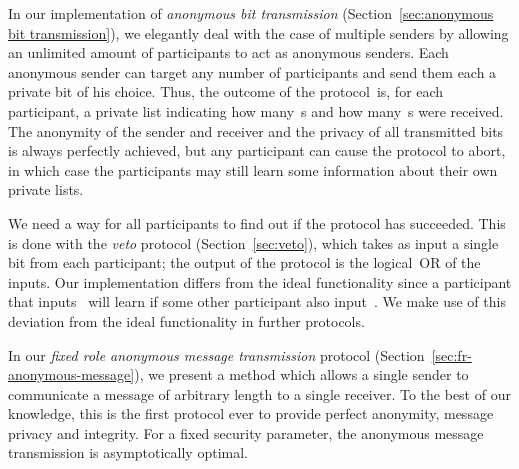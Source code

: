 \documentclass[11pt]{article}
\begin{document}
In our implementation of \emph{anonymous bit transmission}
(Section~\ref{sec:anonymous bit transmission}), we elegantly deal
with the case of multiple senders by allowing an unlimited amount of
participants to act as anonymous senders. Each anonymous sender can
target any number of participants and send them each a private bit
of his choice. Thus, the outcome of the protocol~is, for each
participant, a private list indicating how many~s and how
many~s were received. The anonymity of the sender and  receiver
and the privacy of all transmitted bits is always perfectly
achieved, but any participant can cause the protocol to abort, in
which case the participants may still learn some information about
their own private lists.


We need a way for all participants to find out if the protocol has
succeeded. This is done with the \emph{veto} protocol
(Section~\ref{sec:veto}), which takes as input a single bit from
each participant; the output of the protocol is the logical~OR of
the inputs. Our implementation differs from the ideal functionality
since a participant that inputs~ will learn if some other
participant also input~. We make use of this deviation from the
ideal functionality in further protocols.


In our \emph{fixed role anonymous message transmission} protocol
(Section~\ref{sec:fr-anonymous-message}), we present a method which
allows a single sender to communicate a message of arbitrary length
to a single receiver. To the best of our knowledge, this is the
first protocol ever to provide perfect anonymity, message privacy
and integrity. For a fixed security parameter, the anonymous message
transmission is asymptotically optimal.
\end{document}
